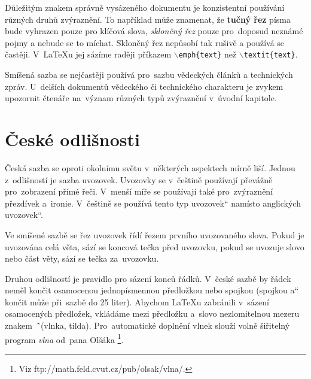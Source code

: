 \documentclass[11pt,a4paper,twocolumn]{article}
\newcommand{\myuv}[1]{\quotedblbase #1\textquotedblleft}
\begin{document}
      Důležitým znakem správně vysázeného do\-ku\-men\-tu je konzistentní používání různých druhů zvý\-raz\-ně\-ní. To například může znamenat, že \textbf{tuč\-ný řez} písma bude vyhrazen pouze pro klí\-čo\-vá slo\-va, \textit{skloněný řez} pouze pro~doposud nez\-ná\-mé pojmy a nebude se to míchat. Sklo\-ně\-ný řez nepůsobí tak rušivě a používá se častěji. V~\LaTeX u jej sázíme raději příkazem $\backslash$\texttt{emph\{text\}} než $\backslash$\texttt{textit\{text\}}.

      Smíšená sazba se nejčastěji používá pro~sazbu vědeckých článků a technických zpráv. U~delších dokumentů vědeckého či technického charakteru je zvykem upozornit čtenáře na~význam různých typů zvýraznění v~úvodní kapitole.

   \section{České odlišnosti}

      Česká sazba se oproti okolnímu světu v~některých aspektech mírně liší. Jednou z~odlišností je sazba uvozovek. Uvozovky se v~češtině používají převážně pro~zobrazení přímé řeči. V~menší míře se používají také pro~zvýraznění přezdívek a~ironie. V~češtině se používá tento \myuv{typ uvozovek} namísto anglických \myuv{uvozovek}.

      Ve smíšené sazbě se řez uvozovek řídí řezem prvního uvozovaného slova. Pokud je uvozována celá věta, sází se koncová tečka před uvozovku, pokud se uvozuje slovo nebo část věty, sází se tečka za~uvozovku.

      Druhou odlišností je pravidlo pro sázení konců řádků. V~české sazbě by řádek neměl končit osamocenou jednopísmennou předložkou nebo spojkou (spojkou \myuv{a} končit může při~sazbě do 25 liter). Abychom \LaTeX u zabránili v~sázení osamocených předložek, vkládáme mezi předložku a~slovo nezlomitelnou mezeru znakem\ \~\ (vlnka, tilda). Pro~automatické doplnění vlnek slouží volně šiřitelný program \textit{vlna} od~pana Olšáka \footnote{Viz ftp://math.feld.cvut.cz/pub/olsak/vlna/.}.
\end{document}
